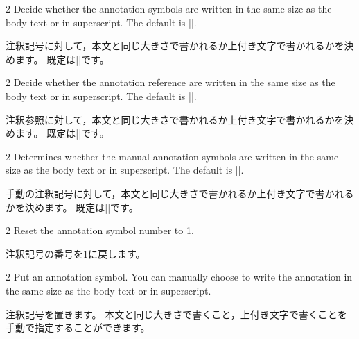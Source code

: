 \documentclass[%
fleqn,%
paper=a4paper,%
fontsize=10pt,%
open_bracket_pos=zenkakunibu_nibu,%
hanging_punctuation,%
]%
{jlreq}
\newenvironment{translateing}%
{\begin{multicolpar}{2}}
{\end{multicolpar}\vspace{\baselineskip}}
\DeclareRobustCommand{\commandtojskip}{\hspace{2.40554pt plus 1.49994pt minus 0.59998pt}}
\begin{document}
\begin{translateing}
Decide whether the annotation symbols are written in the same size as the body text or in superscript.
The default is |\setasternotesuperscript|.

注釈記号に対して，本文と同じ大きさで書かれるか上付き文字で書かれるかを決めます。
既定は\commandtojskip|\setasternotesuperscript|です。
\end{translateing}

\macroexplanation{\setasterreftext}
\quad
\macroexplanation{\setasterrefsuperscript}

\begin{translateing}
Decide whether the annotation reference are written in the same size as the body text or in superscript.
The default is |\setasterreftext|.

注釈参照に対して，本文と同じ大きさで書かれるか上付き文字で書かれるかを決めます。
既定は\commandtojskip|\setasterreftext|です。
\end{translateing}

\macroexplanation{\setasternumbertext}
\quad
\macroexplanation{\setasternumbersuperscript}

\begin{translateing}
Determines whether the manual annotation symbols are written in the same size as the body text or in superscript.
The default is |\setasternumbertext|.

手動の注釈記号に対して，本文と同じ大きさで書かれるか上付き文字で書かれるかを決めます。
既定は\commandtojskip|\setasternumbertext|です。
\end{translateing}

\macroexplanation{\asternotereset}

\begin{translateing}
Reset the annotation symbol number to 1.

注釈記号の番号を1に戻します。
\end{translateing}

\quad
{}
\quad
{}

\begin{translateing}
Put an annotation symbol.
You can manually choose to write the annotation in the same size as the body text or in superscript.

注釈記号を置きます。
本文と同じ大きさで書くこと，上付き文字で書くことを手動で指定することができます。
\end{translateing}
\end{document}
